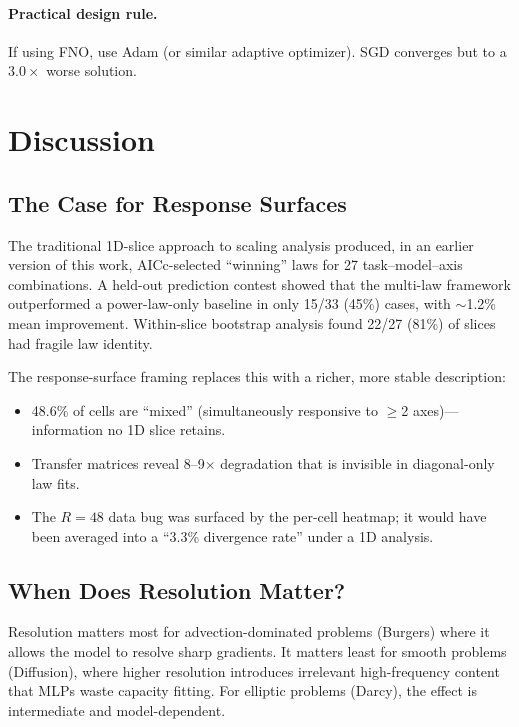 \documentclass[11pt]{article}
\newcommand{\sgdFnoRatio}{3.0}
\newcommand{\holdoutWinFraction}{15/33 (45\%)}
\newcommand{\holdoutMeanImprovement}{1.2\%}
\newcommand{\withinSliceUnstableFrac}{22/27 (81\%)}
\begin{document}
\paragraph{Practical design rule.}
If using FNO, use Adam (or similar adaptive optimizer). SGD converges
but to a $\sgdFnoRatio{\times}$ worse solution.


\section{Discussion}
\label{sec:discussion}

\subsection{The Case for Response Surfaces}

The traditional 1D-slice approach to scaling analysis produced, in an
earlier version of this work, AICc-selected ``winning'' laws for 27
task--model--axis combinations. A held-out prediction contest showed
that the multi-law framework outperformed a power-law-only baseline
in only \holdoutWinFraction{} cases, with ${\sim}$\holdoutMeanImprovement{}
mean improvement. Within-slice bootstrap analysis found
\withinSliceUnstableFrac{} of slices had fragile law identity.

The response-surface framing replaces this with a richer, more stable
description:
\begin{itemize}
  \item 48.6\% of cells are ``mixed'' (simultaneously responsive to
    $\geq$2 axes)---information no 1D slice retains.
  \item Transfer matrices reveal 8--9$\times$ degradation that is
    invisible in diagonal-only law fits.
  \item The $R{=}48$ data bug was surfaced by the per-cell heatmap;
    it would have been averaged into a ``3.3\% divergence rate''
    under a 1D analysis.
\end{itemize}

\subsection{When Does Resolution Matter?}

Resolution matters most for advection-dominated problems (Burgers)
where it allows the model to resolve sharp gradients. It matters least
for smooth problems (Diffusion), where higher resolution introduces
irrelevant high-frequency content that MLPs waste capacity fitting.
For elliptic problems (Darcy), the effect is intermediate and
model-dependent.
\end{document}
